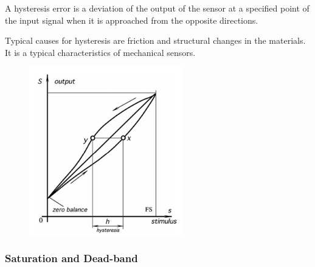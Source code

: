 \begin{minipage}[c]{.45\linewidth}	  
A hysteresis error is a deviation of the output of the sensor at a specified point of the input signal when it is approached from the opposite directions.

Typical causes for hysteresis are friction and structural changes in the materials. It is a typical characteristics of mechanical sensors. 
\end{minipage} \hfill
\begin{minipage}[c]{.45\linewidth}
   \begin{figure}[H]
    \centering
    \includegraphics[width = 0.6\textwidth]{L1/img/hysteresis.PNG}
\end{figure}

   \end{minipage}
   

\subsubsection{Saturation and Dead-band}


